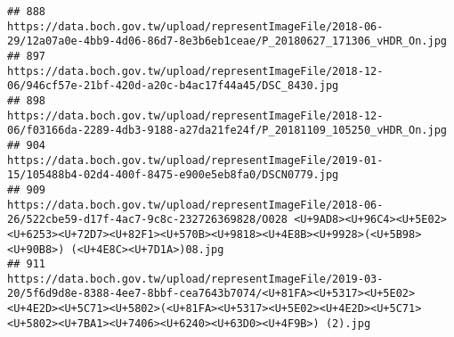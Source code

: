 \documentclass[
]{article}
\begin{document}
\begin{verbatim}
## 888                                                                                                                                                                                                                                                                                                                                                                           https://data.boch.gov.tw/upload/representImageFile/2018-06-29/12a07a0e-4bb9-4d06-86d7-8e3b6eb1ceae/P_20180627_171306_vHDR_On.jpg
## 897                                                                                                                                                                                                                                                                                                                                                                                            https://data.boch.gov.tw/upload/representImageFile/2018-12-06/946cf57e-21bf-420d-a20c-b4ac17f44a45/DSC_8430.jpg
## 898                                                                                                                                                                                                                                                                                                                                                                           https://data.boch.gov.tw/upload/representImageFile/2018-12-06/f03166da-2289-4db3-9188-a27da21fe24f/P_20181109_105250_vHDR_On.jpg
## 904                                                                                                                                                                                                                                                                                                                                                                                            https://data.boch.gov.tw/upload/representImageFile/2019-01-15/105488b4-02d4-400f-8475-e900e5eb8fa0/DSCN0779.jpg
## 909                                                                                                                                                                                                                                                                       https://data.boch.gov.tw/upload/representImageFile/2018-06-26/522cbe59-d17f-4ac7-9c8c-232726369828/O028 <U+9AD8><U+96C4><U+5E02> <U+6253><U+72D7><U+82F1><U+570B><U+9818><U+4E8B><U+9928>(<U+5B98><U+90B8>) (<U+4E8C><U+7D1A>)08.jpg
## 911                                                                                                                                                                                                                                                      https://data.boch.gov.tw/upload/representImageFile/2019-03-20/5f6d9d8e-8388-4ee7-8bbf-cea7643b7074/<U+81FA><U+5317><U+5E02><U+4E2D><U+5C71><U+5802>(<U+81FA><U+5317><U+5E02><U+4E2D><U+5C71><U+5802><U+7BA1><U+7406><U+6240><U+63D0><U+4F9B>) (2).jpg

\end{verbatim}
\end{document}
